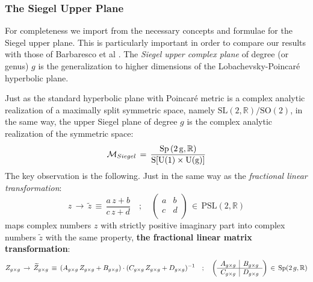 \documentclass[10pt,a4paper]{article}
\newcommand{\Sp}{\mathop{\rm {}Sp}}
\def\tilde{\widetilde}
\begin{document}
\subsubsection{The Siegel Upper Plane}
For completeness we import from \cite{pgtstheory} the necessary concepts and formulae for the Siegel upper plane. This is particularly important in order to compare our results with those of Barbaresco et al \cite{caldobarbaresco,barbaresco2,barbaresco3,marlegibbs,marlentropia}.
The \textit{Siegel upper complex plane} of degree (or genus) $g$ is the generalization to higher dimensions of the Lobachevsky-Poincar\'e
hyperbolic plane.
\par
Just as the standard hyperbolic plane with Poincar\'e metric is a complex analytic realization of a maximally split
symmetric space, namely $\mathrm{SL(2,\mathbb{R})/SO(2)}$, in the same way, the upper Siegel plane of degree $g$ is the complex analytic
realization of the symmetric space:
\begin{equation}\label{siegelsymspac}
  \mathcal{M}_{Siegel} \, = \, \frac{\Sp\mathrm{(2\,g, \mathbb{R})}}{\mathrm{S[U(1)\times U(g)]}}
\end{equation}
The key observation is the following. Just in the same way as the \textit{fractional linear transformation}:
\begin{equation}\label{fraclin}
  z \, \rightarrow \, \tilde{z} \, \equiv \, \frac{a \,z +b }{c\, z + d } \quad ; \quad \left(
  \begin{array}{cc}
     a & b \\
     c & d \\
     \end{array}
 \right) \, \in \, \mathrm{PSL(2,\mathbb{R})}
\end{equation}
maps complex numbers $z$ with strictly positive imaginary part into complex numbers $\tilde{z}$ with the same property, \textbf{the fractional
linear matrix transformation}:
\begin{equation}\label{fraclinmat}
  Z_{g\times g} \, \rightarrow \, \tilde{Z}_{g\times g} \, \equiv \, (A_{g\times g} \,Z_{g\times g}
  +B_{g\times g} )\cdot(C_{g\times g}\,Z_{g\times g} + D_{g\times g})^{-1} \quad ; \quad \left(
  \begin{array}{c|c}
   A_{g\times g} & B_{g\times g} \\
   \hline
   C_{g\times g} &  D_{g\times g} \\
   \end{array}
\right) \, \in \, \Sp(2\,g,\mathbb{R})
\end{equation}
\end{document}

